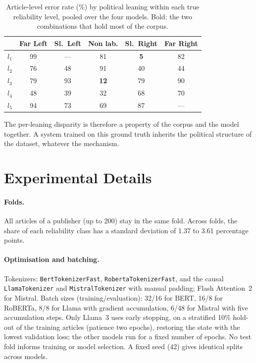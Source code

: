 \documentclass[11pt,a4paper]{article}
\begin{document}
\begin{table}[ht]
\centering
\begin{tabular}{lccccc}
\toprule
& \textbf{Far Left} & \textbf{Sl.\ Left} & \textbf{Non lab.} & \textbf{Sl.\ Right} & \textbf{Far Right} \\
\midrule
$l_1$ & 99 & --- & 81 & \textbf{5} & 82 \\
$l_2$ & 76 & 48 & 91 & 40 & 44 \\
$l_3$ & 79 & 93 & \textbf{12} & 79 & 90 \\
$l_4$ & 48 & 39 & 32 & 68 & 70 \\
$l_5$ & 94 & 73 & 69 & 87 & --- \\
\bottomrule
\end{tabular}
\caption{Article-level error rate (\%) by political leaning within each true
reliability level, pooled over the four models. Bold: the two combinations that
hold most of the corpus.}
\label{tab:err_within}
\end{table}

The per-leaning disparity is therefore a property of the corpus and the model together. A system trained on this ground truth inherits the political structure of the dataset, whatever the mechanism.

\section{Experimental Details}
\label{app:experimental_details}

\paragraph{Folds.}
All articles of a publisher (up to 200) stay in the same fold. Across folds, the share of each reliability class has a standard deviation of 1.37 to 3.61 percentage points.

\paragraph{Optimisation and batching.}
Tokenizers: \texttt{BertTokenizerFast}, \texttt{RobertaTokenizerFast}, and the causal \texttt{LlamaTokenizer} and \texttt{MistralTokenizer} with manual padding; Flash Attention~2 for Mistral. Batch sizes (training/evaluation): 32/16 for BERT, 16/8 for RoBERTa, 8/8 for Llama with gradient accumulation, 6/48 for Mistral with five accumulation steps. Only Llama~3 uses early stopping, on a stratified 10\% hold-out of the training articles (patience two epochs), restoring the state with the lowest validation loss; the other models run for a fixed number of epochs. No test fold informs training or model selection. A fixed seed (42) gives identical splits across models.
\end{document}
